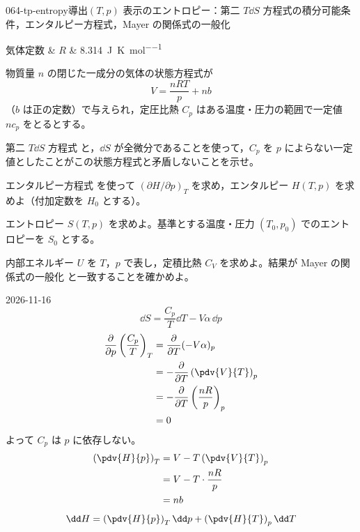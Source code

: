 \documentclass[uplatex,dvipdfmx,a4paper,11pt]{jsarticle}
\begin{document}
\begin{mondai}{064-tp-entropy}{導出}{$(T,p)$ 表示のエントロピー：第二 $T\dd S$ 方程式の積分可能条件，エンタルピー方程式，Mayer の関係式の一般化}
\begin{teisuu}
  気体定数 & $R$ & \qty{8.314}{\joule\per\kelvin\per\mole}\\
\end{teisuu}
物質量 $n$ の閉じた一成分の気体の状態方程式が
  \[ V = \frac{nRT}{p} + nb \]
  （$b$ は正の定数）で与えられ，定圧比熱 $C_{p}$ はある温度・圧力の範囲で一定値 $nc_{p}$ をとるとする。
  \begin{shoumon}
    \item 第二 $T\dd S$ 方程式  と，$\dd S$ が全微分であることを使って，$C_{p}$ を $p$ によらない一定値としたことがこの状態方程式と矛盾しないことを示せ。
    \item エンタルピー方程式  を使って $(\partial H/\partial p)_{T}$ を求め，エンタルピー $H(T,p)$ を求めよ（付加定数を $H_{0}$ とする）。
    \item エントロピー $S(T,p)$ を求めよ。基準とする温度・圧力 $(T_{0},p_{0})$ でのエントロピーを $S_{0}$ とする。
    \item 内部エネルギー $U$ を $T$，$p$ で表し，定積比熱 $C_{V}$ を求めよ。結果が Mayer の関係式の一般化  と一致することを確かめよ。
  \end{shoumon}
\begin{kotaeutsushi}{2026-11-16}
\[ \dd S=\frac{C_{p}}{T}\dd T-V\alpha\,\dd p \]
\begin{align*}
\frac{\partial}{\partial p}\left(\frac{C_{p}}{T}\right)_{T}&=\frac{\partial}{\partial T}(-V\alpha)_{p}\\
&=-\frac{\partial}{\partial T}\left(\pdv{V}{T}\right)_{p}\\
&=-\frac{\partial}{\partial T}\left(\frac{nR}{p}\right)_{p}\\
&=0
\end{align*}
よって $C_{p}$ は $p$ に依存しない。
\begin{align*}
\left(\pdv{H}{p}\right)_{T}&=V-T\left(\pdv{V}{T}\right)_{p}\\
&=V-T\cdot\frac{nR}{p}\\
&=nb
\end{align*}
\begin{align*}
\dd H&=\left(\pdv{H}{p}\right)_{T}\dd p+\left(\pdv{H}{T}\right)_{p}\dd T\\

\end{align*}
\end{kotaeutsushi}
\end{mondai}
\end{document}
